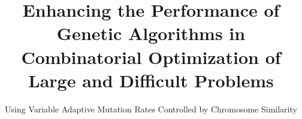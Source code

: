 \documentclass{sig-alternate}
\begin{document}
%

\title{Enhancing the Performance of Genetic Algorithms in Combinatorial Optimization of Large and Difficult Problems}
\subtitle{Using Variable Adaptive Mutation Rates Controlled by Chromosome Similarity}
%
%
%
%
%
\end{document}
